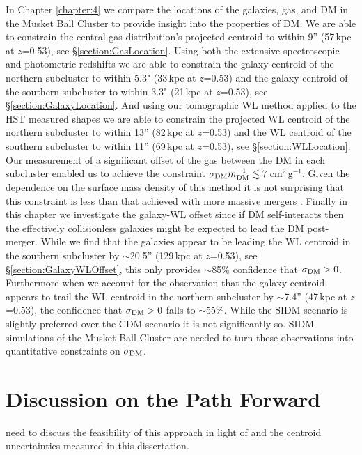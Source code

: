 {In Chapter \ref{chapter:4} we compare the locations of the galaxies, gas, and DM in the Musket Ball Cluster to provide insight into the properties of DM.
We are able to constrain the central gas distribution's projected centroid to within 9'' (57\,kpc at $z$=0.53), see \S\ref{section:GasLocation}.
Using both the extensive spectroscopic and photometric redshifts we are able to constrain the galaxy centroid of the northern subcluster to within 5.3" (33\,kpc at $z$=0.53) and the galaxy centroid of the southern subcluster to within 3.3" (21\,kpc at $z$=0.53), see \S\ref{section:GalaxyLocation}.
And using our tomographic WL method applied to the HST measured shapes we are able to constrain the projected WL centroid of the northern subcluster to within 13'' (82\,kpc at $z$=0.53) and the WL centroid of the southern subcluster to within 11'' (69\,kpc at $z$=0.53), see \S\ref{section:WLLocation}.
Our measurement of a significant offset of the gas between the DM in each subcluster enabled us to achieve the constraint $\sigma_{\rm DM} m_{\rm DM}^{-1} \lesssim 7$\,cm$^2$\,g$^{-1}$.
Given the dependence on the surface mass density of this method it is not surprising that this constraint is less than that achieved with more massive mergers \citep{Markevitch:2004dl, Bradac:2008gw, Merten:2011gu}.
Finally in this chapter we investigate the galaxy-WL offset since if DM self-interacts then the effectively collisionless galaxies might be expected to lead the DM post-merger.
While we find that the galaxies appear to be leading the WL centroid in the southern subcluster by $\sim$20.5'' (129\,kpc at $z$=0.53), see \S\ref{section:GalaxyWLOffset}, this only provides $\sim$85\% confidence that $\sigma_{\rm DM}>0$.
Furthermore when we account for the observation that the galaxy centroid appears to trail the WL centroid in the northern subcluster by $\sim$7.4'' (47\,kpc at $z$=0.53), the confidence that $\sigma_{\rm DM}>0$ falls to $\sim$55\%.
While the SIDM scenario is slightly preferred over the CDM scenario it is not significantly so.
SIDM simulations of the Musket Ball Cluster are needed to turn these observations into quantitative constraints on $\sigma_{\rm DM}$.


\section{Discussion on the Path Forward}






need to discuss the feasibility of this approach in light of \citet{Kahlhoefer:2013wp} and the centroid uncertainties measured in this dissertation.

}
